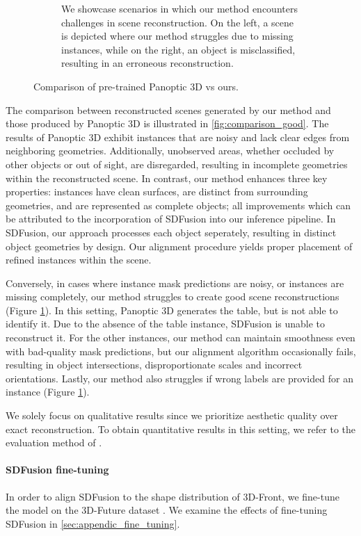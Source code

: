 \begin{figure}
\begin{subfigure}[t]{56mm}
    \caption{We showcase scenarios in which our method encounters challenges in scene reconstruction. On the left, a scene is depicted where our method struggles due to missing instances, while on the right, an object is misclassified, resulting in an erroneous reconstruction.}\label{fig:comparison_bad}
  \end{subfigure}
  \caption{Comparison of pre-trained Panoptic 3D \citep{dahnert2021panoptic} vs ours.}
  \label{fig:comparison_all}
\end{figure}

The comparison between reconstructed scenes generated by our method and those produced by Panoptic 3D is illustrated in \ref{fig:comparison_good}.
The results of Panoptic 3D exhibit instances that are noisy and lack clear edges from neighboring geometries.
Additionally, unobserved areas, whether occluded by other objects or out of sight, are disregarded, resulting in incomplete geometries within the reconstructed scene.
In contrast, our method enhances three key properties: instances have clean surfaces, are distinct from surrounding geometries, and are represented as complete objects;
all improvements which can be attributed to the incorporation of SDFusion into our inference pipeline.
In SDFusion, our approach processes each object seperately, resulting in distinct object geometries by design. Our alignment procedure yields proper placement of refined instances within the scene.

Conversely, in cases where instance mask predictions are noisy, or instances are missing completely, our method struggles to create good scene reconstructions (Figure \ref{fig:comparison_bad}). In this setting, Panoptic 3D generates the table, but is not able to identify it. Due to the absence of the table instance, SDFusion is unable to reconstruct it. For the other instances, our method can maintain smoothness even with bad-quality mask predictions, but our alignment algorithm occasionally fails, resulting in object intersections, disproportionate scales and incorrect orientations. Lastly, our method also struggles if wrong labels are provided for an instance (Figure \ref{fig:comparison_bad}).

We solely focus on qualitative results since we prioritize aesthetic quality over exact reconstruction. To obtain quantitative results in this setting, we refer to the evaluation method of \citet{wu2018learning}.
\paragraph{SDFusion fine-tuning}

In order to align SDFusion to the shape distribution of 3D-Front, we fine-tune the model on the 3D-Future dataset \citep{fu20213e}.
We examine the effects of fine-tuning SDFusion in \ref{sec:appendic_fine_tuning}.
